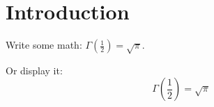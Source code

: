 \documentclass[12pt]{article}
\begin{document}
\section{Introduction}

Write some math: $\Gamma(\frac{1}{2}) = \sqrt{\pi}$.

Or display it:
\[
    \Gamma(\frac{1}{2}) = \sqrt{\pi}
\]
\end{document}
